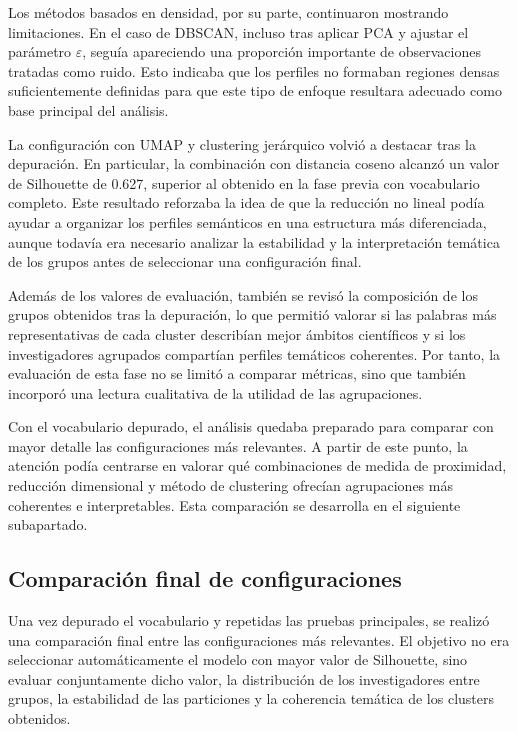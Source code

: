 \documentclass[11pt,spanish,listoffigures,listoftables]{tfgetsinf}
\begin{document}
Los métodos basados en densidad, por su parte, continuaron mostrando limitaciones. En el caso de DBSCAN, incluso tras aplicar PCA y ajustar el parámetro \(\varepsilon\), seguía apareciendo una proporción importante de observaciones tratadas como ruido. Esto indicaba que los perfiles no formaban regiones densas suficientemente definidas para que este tipo de enfoque resultara adecuado como base principal del análisis.

La configuración con UMAP y clustering jerárquico volvió a destacar tras la depuración. En particular, la combinación con distancia coseno alcanzó un valor de Silhouette de 0.627, superior al obtenido en la fase previa con vocabulario completo. Este resultado reforzaba la idea de que la reducción no lineal podía ayudar a organizar los perfiles semánticos en una estructura más diferenciada, aunque todavía era necesario analizar la estabilidad y la interpretación temática de los grupos antes de seleccionar una configuración final.

Además de los valores de evaluación, también se revisó la composición de los grupos obtenidos tras la depuración, lo que permitió valorar si las palabras más representativas de cada cluster describían mejor ámbitos científicos y si los investigadores agrupados compartían perfiles temáticos coherentes. Por tanto, la evaluación de esta fase no se limitó a comparar métricas, sino que también incorporó una lectura cualitativa de la utilidad de las agrupaciones.

Con el vocabulario depurado, el análisis quedaba preparado para comparar con mayor detalle las configuraciones más relevantes. A partir de este punto, la atención podía centrarse en valorar qué combinaciones de medida de proximidad, reducción dimensional y método de clustering ofrecían agrupaciones más coherentes e interpretables. Esta comparación se desarrolla en el siguiente subapartado.

\subsection{Comparación final de configuraciones}

Una vez depurado el vocabulario y repetidas las pruebas principales, se realizó una comparación final entre las configuraciones más relevantes. El objetivo no era seleccionar automáticamente el modelo con mayor valor de Silhouette, sino evaluar conjuntamente dicho valor, la distribución de los investigadores entre grupos, la estabilidad de las particiones y la coherencia temática de los clusters obtenidos.
\end{document}
